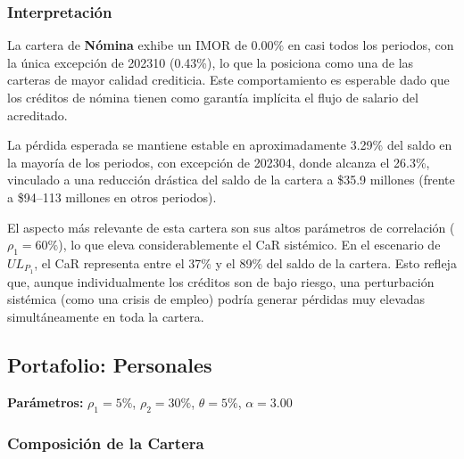 \subsubsection{Interpretación}

La cartera de \textbf{Nómina} exhibe un IMOR de 0.00\% en casi todos los periodos, con la única excepción de 202310 (0.43\%), lo que la posiciona como una de las carteras de mayor calidad crediticia. Este comportamiento es esperable dado que los créditos de nómina tienen como garantía implícita el flujo de salario del acreditado.

La pérdida esperada se mantiene estable en aproximadamente 3.29\% del saldo en la mayoría de los periodos, con excepción de 202304, donde alcanza el 26.3\%, vinculado a una reducción drástica del saldo de la cartera a \$35.9 millones (frente a \$94--113 millones en otros periodos).

El aspecto más relevante de esta cartera son sus altos parámetros de correlación ($\rho_1 = 60\%$), lo que eleva considerablemente el CaR sistémico. En el escenario de $UL_{P_1}$, el CaR representa entre el 37\% y el 89\% del saldo de la cartera. Esto refleja que, aunque individualmente los créditos son de bajo riesgo, una perturbación sistémica (como una crisis de empleo) podría generar pérdidas muy elevadas simultáneamente en toda la cartera.

\newpage

\subsection{Portafolio: Personales}

\textbf{Parámetros:} $\rho_1 = 5\%$, $\rho_2 = 30\%$, $\theta = 5\%$, $\alpha = 3.00$

\subsubsection{Composición de la Cartera}

